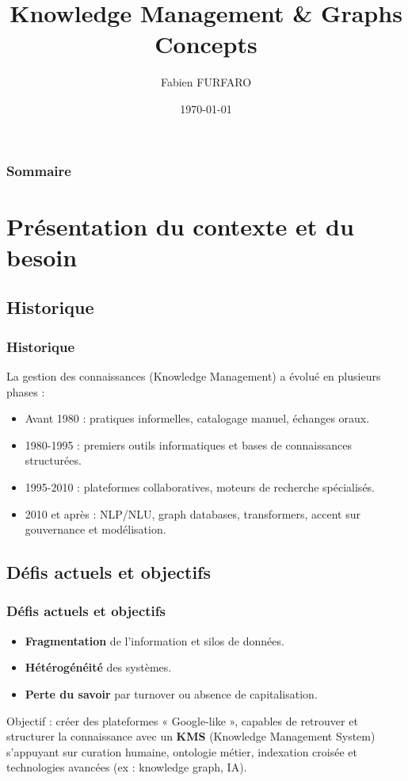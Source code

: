 \documentclass{beamer}
\begin{document}
\title{Knowledge Management \& Graphs Concepts}
\author{Fabien FURFARO}
\date{\today}
\frame{\titlepage}


\begin{frame}
  \frametitle{Sommaire}
  \tableofcontents
\end{frame}

\section{Présentation du contexte et du besoin}

\subsection{Historique}
\begin{frame}
  \frametitle{Historique}

  La gestion des connaissances (Knowledge Management) a évolué en plusieurs phases :
  \begin{itemize}
    \item Avant 1980 : pratiques informelles, catalogage manuel, échanges oraux.
    \item 1980-1995 : premiers outils informatiques et bases de connaissances structurées.
    \item 1995-2010 : plateformes collaboratives, moteurs de recherche spécialisés.
    \item 2010 et après : NLP/NLU, graph databases, transformers, accent sur gouvernance et modélisation.
  \end{itemize}
\end{frame}

\subsection{Défis actuels et objectifs}
\begin{frame}
  \frametitle{Défis actuels et objectifs}
  
  \begin{itemize}
  \item \textbf{Fragmentation} de l'information et silos de données.
  \item \textbf{Hétérogénéité} des systèmes.
  \item \textbf{Perte du savoir} par turnover ou absence de capitalisation.
  \end{itemize}
  
  Objectif : créer des plateformes « Google-like », capables de retrouver et structurer la connaissance avec un \textbf{KMS} (Knowledge Management System) s’appuyant sur curation humaine, ontologie métier, indexation croisée et technologies avancées (ex : knowledge graph, IA).
\end{frame}
\end{document}
